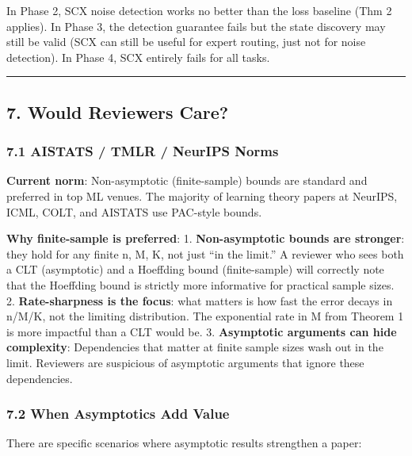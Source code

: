 \documentclass[
  12pt,
]{ctexart}
\begin{document}
In Phase 2, SCX noise detection works no better than the loss baseline
(Thm 2 applies). In Phase 3, the detection guarantee fails but the state
discovery may still be valid (SCX can still be useful for expert
routing, just not for noise detection). In Phase 4, SCX entirely fails
for all tasks.

\begin{center}\rule{0.5\linewidth}{0.5pt}\end{center}

\subsection{7. Would Reviewers Care?}\label{would-reviewers-care}

\subsubsection{7.1 AISTATS / TMLR / NeurIPS
Norms}\label{aistats-tmlr-neurips-norms}

\textbf{Current norm}: Non-asymptotic (finite-sample) bounds are
standard and preferred in top ML venues. The majority of learning theory
papers at NeurIPS, ICML, COLT, and AISTATS use PAC-style bounds.

\textbf{Why finite-sample is preferred}: 1. \textbf{Non-asymptotic
bounds are stronger}: they hold for any finite n, M, K, not just ``in
the limit.'' A reviewer who sees both a CLT (asymptotic) and a Hoeffding
bound (finite-sample) will correctly note that the Hoeffding bound is
strictly more informative for practical sample sizes. 2.
\textbf{Rate-sharpness is the focus}: what matters is how fast the error
decays in n/M/K, not the limiting distribution. The exponential rate in
M from Theorem 1 is more impactful than a CLT would be. 3.
\textbf{Asymptotic arguments can hide complexity}: Dependencies that
matter at finite sample sizes wash out in the limit. Reviewers are
suspicious of asymptotic arguments that ignore these dependencies.

\subsubsection{7.2 When Asymptotics Add
Value}\label{when-asymptotics-add-value}

There are specific scenarios where asymptotic results strengthen a
paper:
\end{document}
